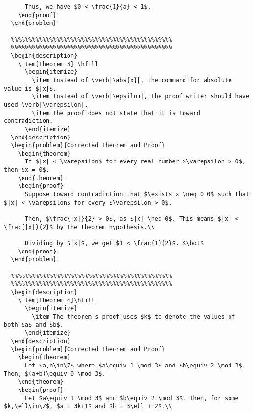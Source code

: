 \documentclass[9pt]{extarticle}
\newtheorem{theorem}{Theorem}
\newcommand{\Z}{\mathbb{Z}}
\begin{document}
\begin{lstlisting}
      Thus, we have $0 < \frac{1}{a} < 1$.
    \end{proof}
  \end{problem}

  %%%%%%%%%%%%%%%%%%%%%%%%%%%%%%%%%%%%%%%%%%%%%%
  %%%%%%%%%%%%%%%%%%%%%%%%%%%%%%%%%%%%%%%%%%%%%%
  \begin{description}
    \item[Theorem 3] \hfill
      \begin{itemize}
        \item Instead of \verb|\abs{x}|, the command for absolute value is $|x|$.
        \item Instead of \verb|\epsilon|, the proof writer should have used \verb|\varepsilon|.
        \item The proof does not state that it is toward contradiction.
      \end{itemize}
  \end{description}
  \begin{problem}{Corrected Theorem and Proof}
    \begin{theorem}
      If $|x| < \varepsilon$ for every real number $\varepsilon > 0$, then $x = 0$.
    \end{theorem}
    \begin{proof}
      Suppose toward contradiction that $\exists x \neq 0 0$ such that $|x| < \varepsilon$ for every $\varepsilon > 0$.

      Then, $\frac{|x|}{2} > 0$, as $|x| \neq 0$. This means $|x| < \frac{|x|}{2}$ by the theorem hypothesis.\\

      Dividing by $|x|$, we get $1 < \frac{1}{2}$. $\bot$
    \end{proof}
  \end{problem}

  %%%%%%%%%%%%%%%%%%%%%%%%%%%%%%%%%%%%%%%%%%%%%%
  %%%%%%%%%%%%%%%%%%%%%%%%%%%%%%%%%%%%%%%%%%%%%%
  \begin{description}
    \item[Theorem 4]\hfill
      \begin{itemize}
        \item The theorem's proof uses $k$ to denote the values of both $a$ and $b$.
      \end{itemize}
  \end{description}
  \begin{problem}{Corrected Theorem and Proof}
    \begin{theorem}
      Let $a,b\in\Z$ where $a\equiv 1 \mod 3$ and $b\equiv 2 \mod 3$. Then, $(a+b)\equiv 0 \mod 3$.
    \end{theorem}
    \begin{proof}
      Let $a\equiv 1 \mod 3$ and $b\equiv 2 \mod 3$. Then, for some $k,\ell\in\Z$, $a = 3k+1$ and $b = 3\ell + 2$.\\


\end{lstlisting}
\end{document}
